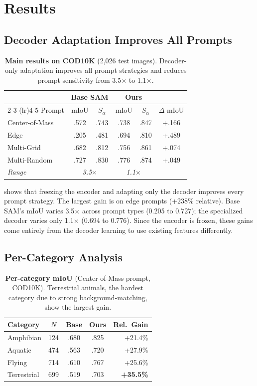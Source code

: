\documentclass[10pt,twocolumn,letterpaper]{article}
\begin{document}
\section{Results}
\subsection{Decoder Adaptation Improves All Prompts}

\begin{table}[t]
\centering
\caption{\textbf{Main results on COD10K} (2,026 test images). Decoder-only adaptation improves all prompt strategies and reduces prompt sensitivity from 3.5$\times$ to 1.1$\times$.}
\label{tab:main_viscon}
\small
\begin{tabular}{l cc cc c}
\toprule
 & \multicolumn{2}{c}{Base SAM} & \multicolumn{2}{c}{Ours} & \\
\cmidrule(lr){2-3} \cmidrule(lr){4-5}
Prompt & mIoU & $S_\alpha$ & mIoU & $S_\alpha$ & $\Delta$ mIoU \\
\midrule
Center-of-Mass & .572 & .743 & .738 & .847 & +.166 \\
Edge & .205 & .481 & .694 & .810 & +.489 \\
Multi-Grid & .682 & .812 & .756 & .861 & +.074 \\
Multi-Random & .727 & .830 & .776 & .874 & +.049 \\
\midrule
\textit{Range} & \multicolumn{2}{c}{\textit{3.5$\times$}} & \multicolumn{2}{c}{\textit{1.1$\times$}} & \\
\bottomrule
\end{tabular}
\end{table}

 shows that freezing the encoder and adapting only the decoder improves every prompt strategy. The largest gain is on edge prompts (+238\% relative). Base SAM's mIoU varies 3.5$\times$ across prompt types (0.205 to 0.727); the specialized decoder varies only 1.1$\times$ (0.694 to 0.776). Since the encoder is frozen, these gains come entirely from the decoder learning to use existing features differently.

\subsection{Per-Category Analysis}

\begin{table}[t]
\centering
\caption{\textbf{Per-category mIoU} (Center-of-Mass prompt, COD10K). Terrestrial animals, the hardest category due to strong background-matching, show the largest gain.}
\label{tab:category}
\small
\begin{tabular}{lcccr}
\toprule
Category & $N$ & Base & Ours & Rel.~Gain \\
\midrule
Amphibian & 124 & .680 & .825 & +21.4\% \\
Aquatic & 474 & .563 & .720 & +27.9\% \\
Flying & 714 & .610 & .767 & +25.6\% \\
Terrestrial & 699 & .519 & .703 & \textbf{+35.5\%} \\
\bottomrule
\end{tabular}
\end{table}
\end{document}
